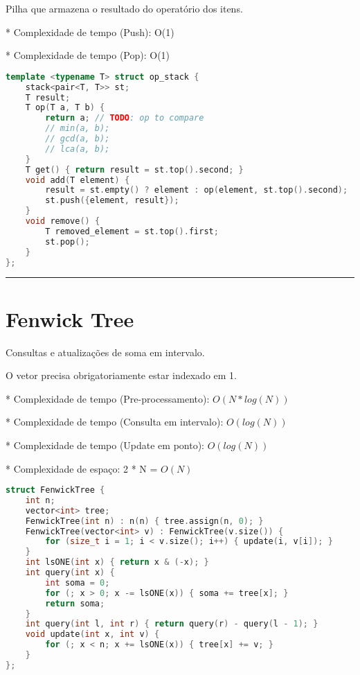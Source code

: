 \documentclass[11pt, a4paper, twoside]{book}
\begin{document}
Pilha que armazena o resultado do operatório dos itens.



* Complexidade de tempo (Push): O(1)

* Complexidade de tempo (Pop): O(1)


\hfill

\begin{lstlisting}[language=C++]
template <typename T> struct op_stack {
    stack<pair<T, T>> st;
    T result;
    T op(T a, T b) {
        return a; // TODO: op to compare
        // min(a, b);
        // gcd(a, b);
        // lca(a, b);
    }
    T get() { return result = st.top().second; }
    void add(T element) {
        result = st.empty() ? element : op(element, st.top().second);
        st.push({element, result});
    }
    void remove() {
        T removed_element = st.top().first;
        st.pop();
    }
};
\end{lstlisting}

\hfill

\rule{\textwidth}{0.4pt}

\section{Fenwick Tree}



Consultas e atualizações de soma em intervalo.



O vetor precisa obrigatoriamente estar indexado em 1.



* Complexidade de tempo (Pre-processamento): $O(N * log(N))$

* Complexidade de tempo (Consulta em intervalo): $O(log(N))$

* Complexidade de tempo (Update em ponto): $O(log(N))$

* Complexidade de espaço: 2 * N = $O(N)$

\hfill

\begin{lstlisting}[language=C++]
struct FenwickTree {
    int n;
    vector<int> tree;
    FenwickTree(int n) : n(n) { tree.assign(n, 0); }
    FenwickTree(vector<int> v) : FenwickTree(v.size()) {
        for (size_t i = 1; i < v.size(); i++) { update(i, v[i]); }
    }
    int lsONE(int x) { return x & (-x); }
    int query(int x) {
        int soma = 0;
        for (; x > 0; x -= lsONE(x)) { soma += tree[x]; }
        return soma;
    }
    int query(int l, int r) { return query(r) - query(l - 1); }
    void update(int x, int v) {
        for (; x < n; x += lsONE(x)) { tree[x] += v; }
    }
};
\end{lstlisting}
\end{document}
